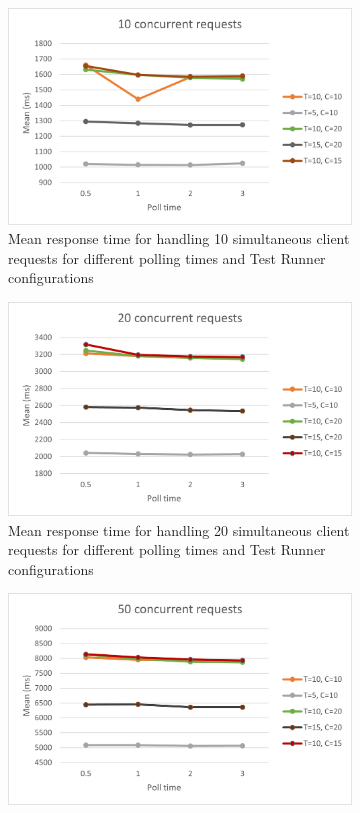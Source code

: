 \begin{figure}
  \centering
  \begin{subfigure}[b]{0.45\textwidth}
      \centering
      \includegraphics[scale=0.65]{images/10.png}
      \caption{Mean response time for handling 10 simultaneous client requests for different polling times and Test Runner configurations}
      \label{fig:resultstart}
  \end{subfigure}
  \hfill
  \begin{subfigure}[b]{0.45\textwidth}
    \centering
    \includegraphics[scale=0.65]{images/20.png}
    \caption{Mean response time for handling 20 simultaneous client requests for different polling times and Test Runner configurations}
  \end{subfigure}
  \hfill
  \begin{subfigure}[b]{0.45\textwidth}
    \centering
    \includegraphics[scale=0.65]{images/50.png}

\end{subfigure}
\end{figure}
